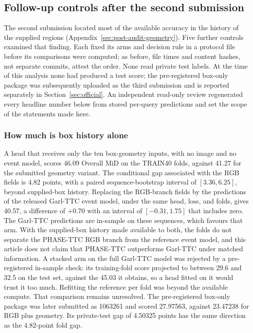 \subsection{Follow-up controls after the second submission}
\label{sec:followup}

The second submission located most of the available accuracy in the history of the supplied regions (Appendix~\ref{sec:post-audit-geometry}). Five further controls examined that finding. Each fixed its arms and decision rule in a protocol file before its comparisons were computed; as before, file times and content hashes, not separate commits, attest the order. None read private test labels. At the time of this analysis none had produced a test score; the pre-registered box-only package was subsequently uploaded as the third submission and is reported separately in Section~\ref{sec:official}. An independent read-only review regenerated every headline number below from stored per-query predictions and set the scope of the statements made here.

\subsubsection{How much is box history alone}
\label{sec:followup-matched}
A head that receives only the ten box-geometry inputs, with no image and no event model, scores 46.09 Overall MiD on the TRAIN40 folds, against 41.27 for the submitted geometry variant. The conditional gap associated with the RGB fields is 4.82 points, with a paired sequence-bootstrap interval of $[3.36,6.25]$, beyond supplied-box history. Replacing the RGB-branch fields by the predictions of the released Garl-TTC event model, under the same head, loss, and folds, gives 40.57, a difference of $+0.70$ with an interval of $[-0.31,1.75]$ that includes zero. The Garl-TTC predictions are in-sample on these sequences, which favours that arm. With the supplied-box history made available to both, the folds do not separate the PHASE-TTC RGB branch from the reference event model, and this article does not claim that PHASE-TTC outperforms Garl-TTC under matched information. A stacked arm on the full Garl-TTC model was rejected by a pre-registered in-sample check: its training-fold score projected to between 29.6 and 32.5 on the test set, against the 45.03 it obtains, so a head fitted on it would trust it too much. Refitting the reference per fold was beyond the available compute. That comparison remains unresolved. The pre-registered box-only package was later submitted as 1063261 and scored 27.97563, against 23.47238 for RGB plus geometry. Its private-test gap of 4.50325 points has the same direction as the 4.82-point fold gap.

